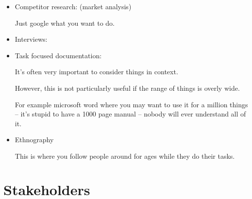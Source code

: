 \documentclass[10pt, a4paper]{article}
\begin{document}
\begin{itemize}
\item

Competitor research: (market analysis)

Just google what you want to do.

\item

Interviews:

\item

Task focused documentation:

It's often very important to consider things in context.

However, this is not particularly useful if the range of things is overly wide.

For example microsoft word where you may want to use it for a million things -- it's stupid to have a 1000 page
manual -- nobody will ever understand all of it.

\item Ethnography

This is where you follow people around for ages while they do their tasks.

\end{itemize}

\section{Stakeholders}
\end{document}
